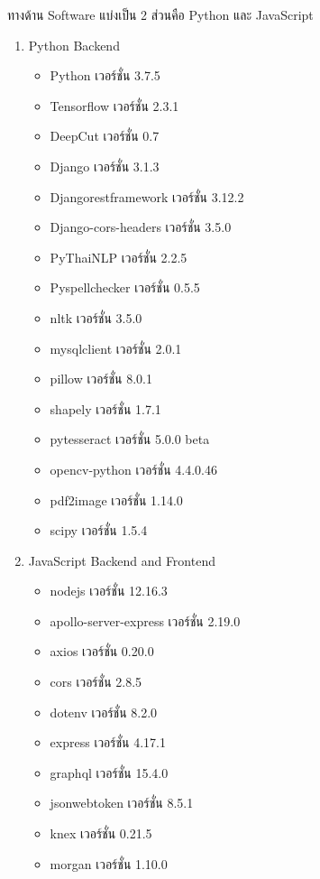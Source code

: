 		ทางด้าน Software แบ่งเป็น 2 ส่วนคือ Python และ JavaScript 
        \begin{enumerate}
            \item Python Backend
            \begin{itemize}
                \item Python เวอร์ชั่น 3.7.5
		        \item Tensorflow เวอร์ชั่น 2.3.1
		        \item DeepCut เวอร์ชั่น 0.7
		        \item Django เวอร์ชั่น 3.1.3
		        \item Djangorestframework เวอร์ชั่น 3.12.2
		        \item Django-cors-headers เวอร์ชั่น 3.5.0
		        \item PyThaiNLP เวอร์ชั่น 2.2.5
		        \item Pyspellchecker เวอร์ชั่น 0.5.5
		        \item nltk เวอร์ชั่น 3.5.0
		        \item mysqlclient เวอร์ชั่น 2.0.1
		        \item pillow เวอร์ชั่น 8.0.1
		        \item shapely เวอร์ชั่น 1.7.1
		        \item pytesseract เวอร์ชั่น 5.0.0 beta
		        \item opencv-python เวอร์ชั่น 4.4.0.46
		        \item pdf2image เวอร์ชั่น 1.14.0
		        \item scipy เวอร์ชั่น 1.5.4
            \end{itemize}
            \item JavaScript Backend and Frontend
		    \begin{itemize}
                \item nodejs เวอร์ชั่น 12.16.3
		        \item apollo-server-express เวอร์ชั่น 2.19.0
		        \item axios เวอร์ชั่น 0.20.0
		        \item cors เวอร์ชั่น 2.8.5
 		        \item dotenv เวอร์ชั่น 8.2.0
		        \item express เวอร์ชั่น 4.17.1
		        \item graphql เวอร์ชั่น 15.4.0
		        \item jsonwebtoken เวอร์ชั่น 8.5.1
		        \item knex เวอร์ชั่น 0.21.5
		        \item morgan เวอร์ชั่น 1.10.0

\end{itemize}
\end{enumerate}

